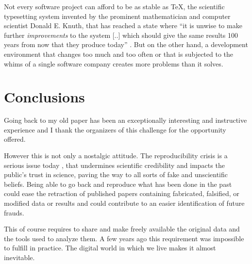 Not every software project can afford to be as stable as \TeX, the scientific typesetting system invented by the prominent mathematician and computer scientist Donald E. Knuth, that has reached a state where ``it is unwise to make further \emph{improvements} to the system [..] which should give the same results 100 years from now that they produce today'' \cite{Knuth:1990}.
But on the other hand, a development environment that changes too much and too often or that is subjected to the whims of a single software company creates more problems than it solves. 



\section{Conclusions}

Going back to my old paper has been an exceptionally interesting and instructive experience and I thank the organizers of this challenge for the opportunity offered.

However this is not only a nostalgic attitude. The reproducibility crisis is a serious issue today \cite{Miyakawa:2020}, that undermines scientific credibility and impacts the public's trust in science, paving the way to all sorts of fake and unscientific beliefs.
Being able to go back and reproduce what has been done in the past could ease the retraction of published papers containing fabricated, falsified, or modified data or results and could contribute to an easier identification of future frauds.

This of course requires to share and make freely available the original data and the tools used to analyze them. A few years ago this requirement was impossible to fulfill in practice. The digital world in which we live makes it almost inevitable.



%
%


